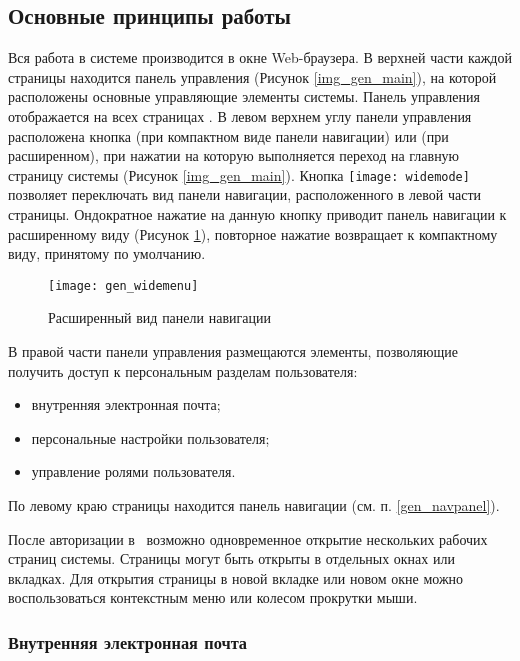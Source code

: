 \subsection{Основные принципы работы}

Вся работа в системе производится в окне Web-браузера. В верхней части каждой страницы находится панель управления (Рисунок \ref{img_gen_main}), на которой расположены основные управляющие элементы системы. Панель управления отображается на всех страницах \tmis.  В левом верхнем углу панели управления расположена кнопка  (при компактном виде панели навигации) или  (при расширенном), при нажатии на которую выполняется переход на главную страницу системы (Рисунок \ref{img_gen_main}). Кнопка \texttt{[image: widemode]} позволяет переключать вид панели навигации, расположенного в левой части страницы. Ондократное нажатие на данную кнопку приводит панель навигации к расширенному виду (Рисунок \ref{img_gen_widemenu}), повторное нажатие возвращает к компактному виду, принятому по умолчанию.

 \begin{figure}[!ht]\centering
 	\texttt{[image: gen\_widemenu]}
 	\caption{Расширенный вид панели навигации}
 	\label{img_gen_widemenu}
 \end{figure}
 
В правой части панели управления размещаются элементы, позволяющие получить доступ к персональным разделам пользователя: 
\begin{itemize}
 \item внутренняя электронная почта;
 \item персональные настройки пользователя;
 \item управление ролями пользователя.
\end{itemize}

По левому краю страницы находится панель навигации (см. п. \ref{gen_navpanel}). 

\begin{prim}
 После авторизации в \tmis~возможно одновременное открытие нескольких рабочих страниц системы. Страницы могут быть открыты в отдельных окнах или вкладках. Для открытия страницы в новой вкладке или новом окне можно воспользоваться контекстным меню или колесом прокрутки мыши.
\end{prim}


\subsubsection{Внутренняя электронная почта}

